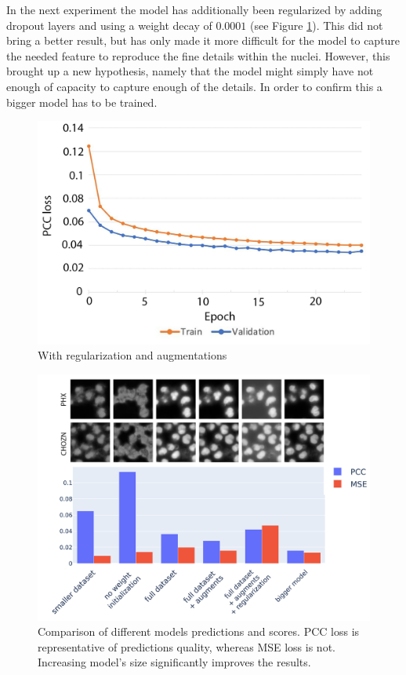 In the next experiment the model has additionally been regularized by adding dropout layers and using a weight decay of $0.0001$ (see Figure \ref{fig:full-dataset-pcc-regularized}). This did not bring a better result, but has only made it more difficult for the model to capture the needed feature to reproduce the fine details within the nuclei. However, this brought up a new hypothesis, namely that the model might simply have not enough of capacity to capture enough of the details. In order to confirm this a bigger model has to be trained.
\begin{figure}[htb]
	\begin{center}
		\includegraphics[width=0.5\linewidth]{bilder/nuclei/full-dataset-regularized.png}
		\caption{With regularization and augmentations}\label{fig:full-dataset-pcc-regularized}
	\end{center}
\end{figure}

\begin{figure}[htb]
	\begin{center}
		\includegraphics[width=0.6\linewidth]{bilder/nuclei/comparison-chzn-phx.png}
		\caption[Comparison of different models predictions and scores]%
		{Comparison of different models predictions and scores. PCC loss is representative of predictions quality, whereas MSE loss is not. Increasing model's size significantly improves the results.}\label{fig:nuclei-comparison-predictions}
	\end{center}
\end{figure}

